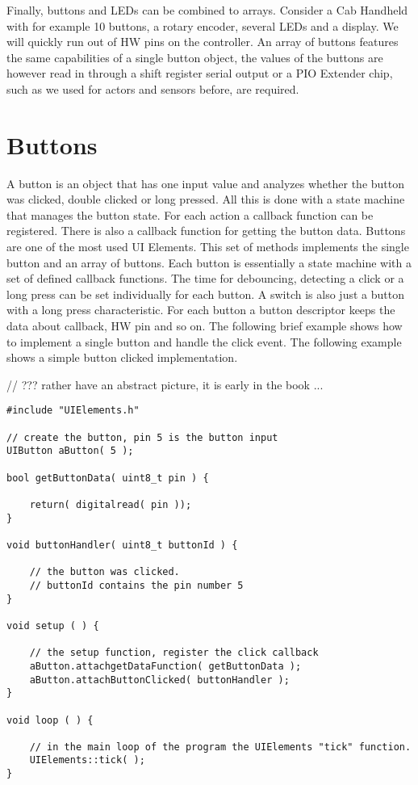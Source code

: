 Finally, buttons and LEDs can be combined to arrays. Consider a Cab Handheld with for example 10 buttons, a rotary encoder, several LEDs and a display. We will quickly run out of HW pins on the controller. An array of buttons features the same capabilities of a single button object, the values of the buttons are however read in through a shift register serial output or a PIO Extender chip, such as we used for actors and sensors before, are required.

\section{Buttons}

A button is an object that has one input value and analyzes whether the button was clicked, double clicked or long pressed. All this is done with a state machine that manages the button state. For each action a callback function can be registered. There is also a callback function for getting the button data. Buttons are one  of the most used UI Elements. This set of methods implements the single button and an array of buttons. Each button is essentially a state machine with a set of defined callback functions. The time for debouncing, detecting a click or a long press can be set individually for each button. A switch is also just a button with a long press characteristic. For each button a button descriptor keeps the data about callback, HW pin and so on. The following brief example shows how to implement a single button and handle the click event. The following example shows a simple button clicked implementation.

// ??? rather have an abstract picture, it is early in the book ...

\lstset{language=c++, style=codesnippetstyle}
\begin{lstlisting}
#include "UIElements.h"

// create the button, pin 5 is the button input
UIButton aButton( 5 );

bool getButtonData( uint8_t pin ) {

	return( digitalread( pin ));
}

void buttonHandler( uint8_t buttonId ) {

	// the button was clicked. 
	// buttonId contains the pin number 5
}

void setup ( ) {

	// the setup function, register the click callback
	aButton.attachgetDataFunction( getButtonData );
	aButton.attachButtonClicked( buttonHandler );
}

void loop ( ) {

    // in the main loop of the program the UIElements "tick" function.
	UIElements::tick( );
}

\end{lstlisting}
\FloatBarrier

